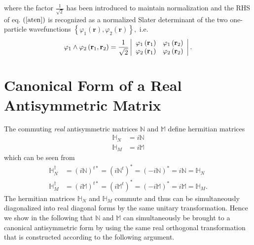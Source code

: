 \documentclass[preprint,aps,showkeys]{revtex4}%
\begin{document}
where the factor $\frac{1}{\sqrt{2}}$ has been introduced to maintain
normalization and the RHS of eq. $\left(  \ref{aten}\right)  $ is recognized
as a normalized Slater determinant of the two one-particle wavefunctions
$\left\{  \varphi_{1}\left(  \mathbf{r}\right)  ,\varphi_{2}\left(
\mathbf{r}\right)  \right\}  ,$ i.e.%
\begin{equation}
\varphi_{1}\wedge\varphi_{2}\left(  \mathbf{r}_{1},\mathbf{r}_{2}\right)
=\frac{1}{\sqrt{2}}\left\vert
\begin{array}
[c]{cc}%
\varphi_{1}\left(  \mathbf{r}_{1}\right)  & \varphi_{1}\left(  \mathbf{r}%
_{2}\right) \\
\varphi_{2}\left(  \mathbf{r}_{1}\right)  & \varphi_{2}\left(  \mathbf{r}%
_{2}\right)
\end{array}
\right\vert .
\end{equation}


\section{Canonical Form of a Real Antisymmetric Matrix\label{realanti}}

The commuting \emph{real }antisymmetric\emph{ }matrices\emph{ }$\mathbb{N}$
and $\mathbb{M}$ define hermitian matrices
\begin{align}
\mathbb{H}_{N}  &  =i\mathbb{N}\nonumber\\
\mathbb{H}_{M}  &  =i\mathbb{M}%
\end{align}
which can be seen from
\begin{align}
\mathbb{H}_{N}^{\dagger}  &  =\left(  i\mathbb{N}\right)  ^{t\ast}=\left(
i\mathbb{N}^{t}\right)  ^{\ast}=\left(  -i\mathbb{N}\right)  ^{\ast
}=i\mathbb{N=H}_{N}\nonumber\\
\mathbb{H}_{M}^{\dagger}  &  =\left(  i\mathbb{M}\right)  ^{t\ast}=\left(
i\mathbb{M}^{t}\right)  ^{\ast}=\left(  -i\mathbb{M}\right)  ^{\ast
}=i\mathbb{M=H}_{M}.
\end{align}
The hermitian matrices $\mathbb{H}_{N}$ and $\mathbb{H}_{M}$ commute and thus
can be simultaneously diagonalized into real diagonal forms by the same
unitary transformation. Hence we show in the following that $\mathbb{N}$ and
$\mathbb{M}$ can simultaneously be brought to a canonical antisymmetric form
by using the same real orthogonal transformation that is constructed according
to the following argument.
\end{document}
